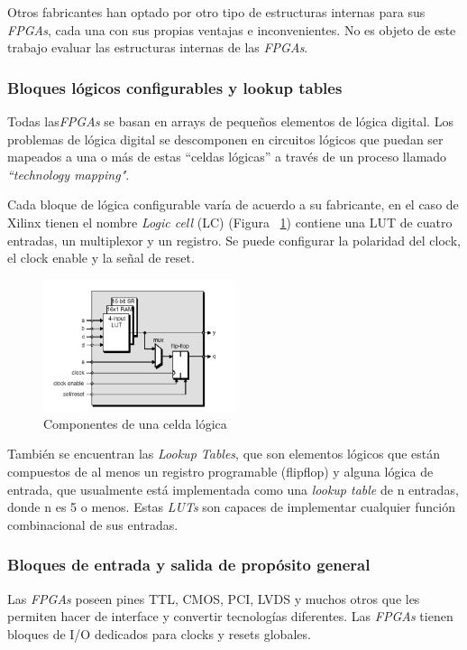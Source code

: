 	Otros fabricantes han optado por otro tipo de estructuras internas para sus \textit{FPGAs}, cada una con sus propias ventajas e inconvenientes. No es objeto
	de este trabajo evaluar las estructuras internas de las \textit{FPGAs}.
	
		\subsubsection{Bloques lógicos configurables y lookup tables}
		Todas las\textit{FPGAs} se basan en arrays de pequeños elementos de lógica digital. Los problemas de lógica digital se descomponen en circuitos
		lógicos que puedan ser mapeados a una o más de estas “celdas lógicas” a través de un proceso llamado \textit{“technology mapping"}.
	
		Cada bloque de lógica configurable varía de acuerdo a su fabricante, en el caso de Xilinx tienen el nombre \textit{Logic cell} (LC) (Figura
		~\ref{fig:complc}) contiene una LUT de cuatro entradas, un multiplexor y un registro. Se puede configurar la polaridad del clock, el clock enable y
		la señal de reset.

		\begin{figure}[h!]
		\begin{center}
 		\includegraphics[width=0.5\textwidth,keepaspectratio=true]{./images/celda}
  		\caption{Componentes de una celda lógica}
  		\label{fig:complc}
 		\end{center}
		\end{figure}

		También se encuentran las \textit{Lookup Tables}, que son elementos lógicos que están compuestos de al menos un registro programable (flip\-flop) y
		alguna lógica de entrada, que usualmente está implementada como una \textit{lookup table} de n entradas, donde n es 5 o menos. Estas \textit{LUTs}
		son capaces de implementar cualquier función combinacional de sus entradas.

		\subsubsection{Bloques de entrada y salida de propósito general}
		Las \textit{FPGAs} poseen pines TTL, CMOS, PCI, LVDS y muchos otros que les permiten hacer de interface y convertir tecnologías diferentes.
		Las \textit{FPGAs} tienen bloques de I/O dedicados para clocks y resets globales.
	
